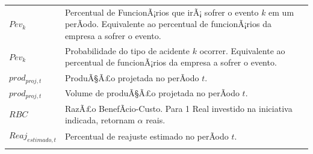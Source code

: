 \documentclass[]{article}
\begin{document}
\begin{longtable}[]{@{}ll@{}}
\begin{minipage}[t]{0.07\columnwidth}\raggedright\strut
\(Pev_{k}\)\strut
\end{minipage} & \begin{minipage}[t]{0.87\columnwidth}\raggedright\strut
Percentual de FuncionÃ¡rios que irÃ¡ sofrer o evento \(k\) em um
perÃ­odo. Equivalente ao percentual de funcionÃ¡rios da empresa a sofrer
o evento.\strut
\end{minipage}\tabularnewline
\begin{minipage}[t]{0.07\columnwidth}\raggedright\strut
\(Pev_{k}\)\strut
\end{minipage} & \begin{minipage}[t]{0.87\columnwidth}\raggedright\strut
Probabilidade do tipo de acidente \(k\) ocorrer. Equivalente ao
percentual de funcionÃ¡rios da empresa a sofrer o evento.\strut
\end{minipage}\tabularnewline
\begin{minipage}[t]{0.07\columnwidth}\raggedright\strut
\(prod_{proj, t}\)\strut
\end{minipage} & \begin{minipage}[t]{0.87\columnwidth}\raggedright\strut
ProduÃ§Ã£o projetada no perÃ­odo \(t\).\strut
\end{minipage}\tabularnewline
\begin{minipage}[t]{0.07\columnwidth}\raggedright\strut
\(prod_{proj, t}\)\strut
\end{minipage} & \begin{minipage}[t]{0.87\columnwidth}\raggedright\strut
Volume de produÃ§Ã£o projetada no perÃ­odo \(t\).\strut
\end{minipage}\tabularnewline
\begin{minipage}[t]{0.07\columnwidth}\raggedright\strut
\(RBC\)\strut
\end{minipage} & \begin{minipage}[t]{0.87\columnwidth}\raggedright\strut
RazÃ£o BenefÃ­cio-Custo. Para 1 Real investido na iniciativa indicada,
retornam \(\alpha\) reais.\strut
\end{minipage}\tabularnewline
\begin{minipage}[t]{0.07\columnwidth}\raggedright\strut
\(Reaj_{estimado, t}\)\strut
\end{minipage} & \begin{minipage}[t]{0.87\columnwidth}\raggedright\strut
Percentual de reajuste estimado no perÃ­odo \(t\).\strut
\end{minipage}\tabularnewline
\begin{minipage}[t]{0.07\columnwidth}\raggedright\strut

\end{minipage}
\end{longtable}
\end{document}
